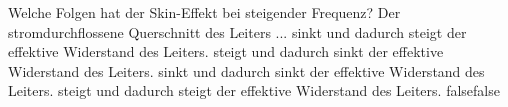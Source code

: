    {Welche Folgen hat der Skin-Effekt bei steigender Frequenz? Der stromdurchflossene Querschnitt des Leiters ...}
    {sinkt und dadurch steigt der effektive Widerstand des Leiters.}
    {steigt und dadurch sinkt der effektive Widerstand des Leiters.}
    {sinkt und dadurch sinkt der effektive Widerstand des Leiters.}
    {steigt und dadurch steigt der effektive Widerstand des Leiters.}
    {false}{false}